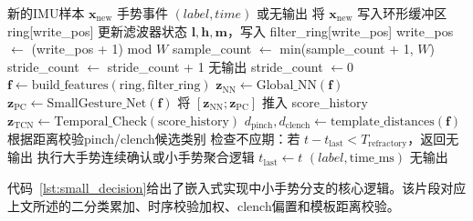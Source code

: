 \documentclass[lettersize,journal]{IEEEtran}
\begin{document}
\begin{algorithm}[htbp]
    \caption{手势识别完整推理流程}
    \label{alg:gesture}
    \begin{algorithmic}[1]
        \REQUIRE 新的IMU样本 $\mathbf{x}_\mathrm{new}$
        \ENSURE 手势事件 $(label, time)$ 或无输出
        \STATE 将 $\mathbf{x}_\mathrm{new}$ 写入环形缓冲区 ring[write\_pos]
        \STATE 更新滤波器状态 $\mathbf{l}, \mathbf{h}, \mathbf{m}$，写入 filter\_ring[write\_pos]
        \STATE write\_pos $\leftarrow$ (write\_pos + 1) mod $W$
        \STATE sample\_count $\leftarrow$ min(sample\_count + 1, $W$)
        \STATE stride\_count $\leftarrow$ stride\_count + 1
            \RETURN 无输出
        \ENDIF
        \STATE stride\_count $\leftarrow 0$
        \STATE $\mathbf{f} \leftarrow \mathrm{build\_features}(\mathrm{ring}, \mathrm{filter\_ring})$ 
        \STATE $\mathbf{z}_\mathrm{NN} \leftarrow \mathrm{Global\_NN}(\mathbf{f})$ 
        \STATE $\mathbf{z}_\mathrm{PC} \leftarrow \mathrm{SmallGesture\_Net}(\mathbf{f})$ 
        \STATE 将 $[\mathbf{z}_\mathrm{NN}; \mathbf{z}_\mathrm{PC}]$ 推入 score\_history
        \STATE $\mathbf{z}_\mathrm{TCN} \leftarrow \mathrm{Temporal\_Check}(\mathrm{score\_history})$
        \STATE $d_\mathrm{pinch}, d_\mathrm{clench} \leftarrow \mathrm{template\_distances}(\mathbf{f})$
        \STATE 根据距离校验pinch/clench候选类别
        \STATE 检查不应期：若 $t - t_\mathrm{last} < T_\mathrm{refractory}$，返回无输出
        \STATE 执行大手势连续确认或小手势聚合逻辑
            \STATE $t_\mathrm{last} \leftarrow t$
            \RETURN $(label, \mathrm{time\_ms})$
        \ENDIF
        \RETURN 无输出
    \end{algorithmic}
\end{algorithm}

代码~\ref{lst:small_decision}给出了嵌入式实现中小手势分支的核心逻辑。该片段对应上文所述的二分类累加、时序校验加权、clench偏置和模板距离校验。
\end{document}

